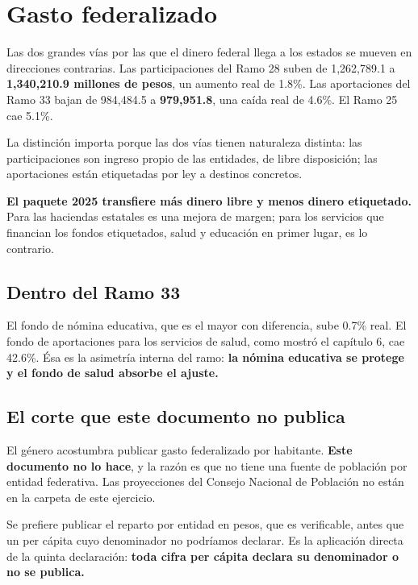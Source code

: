 \chapter{Gasto federalizado}

Las dos grandes vías por las que el dinero federal llega a los estados se mueven
en direcciones contrarias. Las participaciones del Ramo 28 suben de 1,262,789.1 a
\textbf{1,340,210.9 millones de pesos}, un aumento real de 1.8\%. Las aportaciones
del Ramo 33 bajan de 984,484.5 a \textbf{979,951.8}, una caída real de 4.6\%. El
Ramo 25 cae 5.1\%.

La distinción importa porque las dos vías tienen naturaleza distinta: las
participaciones son ingreso propio de las entidades, de libre disposición; las
aportaciones están etiquetadas por ley a destinos concretos.

\textbf{El paquete 2025 transfiere más dinero libre y menos dinero etiquetado.}
Para las haciendas estatales es una mejora de margen; para los servicios que
financian los fondos etiquetados, salud y educación en primer lugar, es lo
contrario.



\section{Dentro del Ramo 33}

El fondo de nómina educativa, que es el mayor con diferencia, sube 0.7\% real. El
fondo de aportaciones para los servicios de salud, como mostró el capítulo 6, cae
42.6\%. Ésa es la asimetría interna del ramo: \textbf{la nómina educativa se
protege y el fondo de salud absorbe el ajuste.}

\section{El corte que este documento no publica}

El género acostumbra publicar gasto federalizado por habitante. \textbf{Este
documento no lo hace}, y la razón es que no tiene una fuente de población por
entidad federativa. Las proyecciones del Consejo Nacional de Población no están en
la carpeta de este ejercicio.

Se prefiere publicar el reparto por entidad en pesos, que es verificable, antes
que un per cápita cuyo denominador no podríamos declarar. Es la aplicación directa
de la quinta declaración: \textbf{toda cifra per cápita declara su denominador o
no se publica.}

\clearpage
